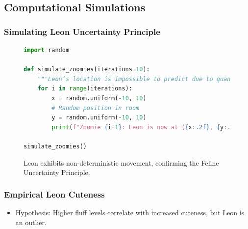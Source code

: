 \documentclass[compress]{beamer}
\begin{document}
\subsection{Computational Simulations}
\begin{frame}[fragile]
  \frametitle{Simulating Leon Uncertainty Principle}
  \begin{figure}
    
\begin{lstlisting}[language=Python, basicstyle=\scriptsize\ttfamily, keywordstyle=\color{blue}, commentstyle=\color{green}]
import random

def simulate_zoomies(iterations=10):
    """Leon’s location is impossible to predict due to quantum zoomie mechanics."""
    for i in range(iterations):
        x = random.uniform(-10, 10) 
        # Random position in room
        y = random.uniform(-10, 10)  
        print(f"Zoomie {i+1}: Leon is now at ({x:.2f}, {y:.2f})")

simulate_zoomies()
\end{lstlisting}
\caption{Leon exhibits non-deterministic movement, confirming the Feline Uncertainty Principle.}

  \end{figure}
\end{frame}

\begin{frame}
\frametitle{Empirical Leon Cuteness}
\begin{itemize}
  \item Hypothesis: Higher fluff levels correlate with increased cuteness, but Leon is an outlier.
\end{itemize}

\end{frame}
\end{document}
